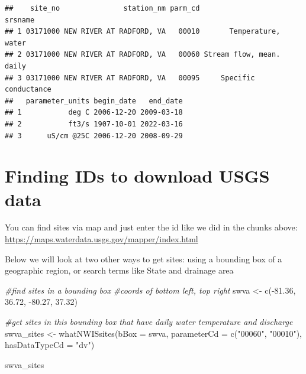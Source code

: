 \documentclass[
]{book}
\newenvironment{Shaded}{\begin{snugshade}}{\end{snugshade}}
\newcommand{\AttributeTok}[1]{\textcolor[rgb]{0.77,0.63,0.00}{#1}}
\newcommand{\CommentTok}[1]{\textcolor[rgb]{0.56,0.35,0.01}{\textit{#1}}}
\newcommand{\FloatTok}[1]{\textcolor[rgb]{0.00,0.00,0.81}{#1}}
\newcommand{\FunctionTok}[1]{\textcolor[rgb]{0.00,0.00,0.00}{#1}}
\newcommand{\NormalTok}[1]{#1}
\newcommand{\OtherTok}[1]{\textcolor[rgb]{0.56,0.35,0.01}{#1}}
\newcommand{\SpecialCharTok}[1]{\textcolor[rgb]{0.00,0.00,0.00}{#1}}
\newcommand{\StringTok}[1]{\textcolor[rgb]{0.31,0.60,0.02}{#1}}
\begin{document}
\begin{verbatim}
##    site_no               station_nm parm_cd                  srsname
## 1 03171000 NEW RIVER AT RADFORD, VA   00010       Temperature, water
## 2 03171000 NEW RIVER AT RADFORD, VA   00060 Stream flow, mean. daily
## 3 03171000 NEW RIVER AT RADFORD, VA   00095     Specific conductance
##   parameter_units begin_date   end_date
## 1           deg C 2006-12-20 2009-03-18
## 2           ft3/s 1907-10-01 2022-03-16
## 3      uS/cm @25C 2006-12-20 2008-09-29
\end{verbatim}

\hypertarget{finding-ids-to-download-usgs-data}{%
\section{Finding IDs to download USGS data}\label{finding-ids-to-download-usgs-data}}

You can find sites via map and just enter the id like we did in the chunks above: \url{https://maps.waterdata.usgs.gov/mapper/index.html}

Below we will look at two other ways to get sites: using a bounding box of a geographic region, or search terms like State and drainage area

\begin{Shaded}
\begin{Highlighting}[]
\CommentTok{\#find sites in a bounding box}
\CommentTok{\#coords of bottom left, top right}
\NormalTok{swva }\OtherTok{\textless{}{-}} \FunctionTok{c}\NormalTok{(}\SpecialCharTok{{-}}\FloatTok{81.36}\NormalTok{, }\FloatTok{36.72}\NormalTok{, }\SpecialCharTok{{-}}\FloatTok{80.27}\NormalTok{, }\FloatTok{37.32}\NormalTok{)}

\CommentTok{\#get sites in this bounding box that have daily water temperature and discharge}
\NormalTok{swva\_sites }\OtherTok{\textless{}{-}} \FunctionTok{whatNWISsites}\NormalTok{(}\AttributeTok{bBox =}\NormalTok{ swva, }
                            \AttributeTok{parameterCd =} \FunctionTok{c}\NormalTok{(}\StringTok{"00060"}\NormalTok{, }\StringTok{"00010"}\NormalTok{), }
                            \AttributeTok{hasDataTypeCd =} \StringTok{"dv"}\NormalTok{)}

\NormalTok{swva\_sites}
\end{Highlighting}
\end{Shaded}
\end{document}

